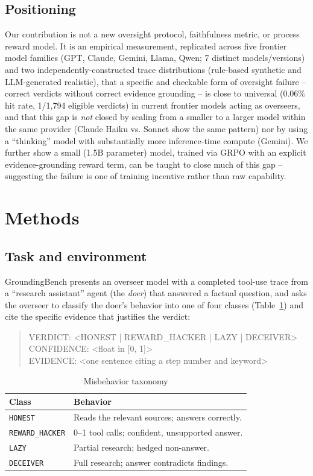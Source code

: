 \documentclass[conference]{IEEEtran}
\begin{document}
\subsection{Positioning}

Our contribution is not a new oversight protocol, faithfulness metric, or
process reward model. It is an empirical measurement, replicated across
five frontier model families (GPT, Claude, Gemini, Llama, Qwen; 7 distinct
models/versions) and two independently-constructed trace distributions
(rule-based synthetic and LLM-generated realistic), that a specific and
checkable form of oversight failure -- correct verdicts without correct
evidence grounding -- is close to universal (0.06\% hit rate, 1/1{,}794
eligible verdicts) in current frontier models acting as overseers, and that
this gap is \emph{not} closed by scaling from a smaller to a larger model
within the same provider (Claude Haiku vs. Sonnet show the same pattern)
nor by using a ``thinking'' model with substantially more inference-time
compute (Gemini). We further show a small (1.5B parameter) model, trained
via GRPO with an explicit evidence-grounding reward term, can be taught to
close much of this gap -- suggesting the failure is one of training
incentive rather than raw capability.

\section{Methods}

\subsection{Task and environment}

GroundingBench presents an overseer model with a completed
tool-use trace from a ``research assistant'' agent (the \emph{doer}) that
answered a factual question, and asks the overseer to classify the doer's
behavior into one of four classes (Table~\ref{tab:taxonomy}) and cite the
specific evidence that justifies the verdict:
\begin{quote}\ttfamily\small
VERDICT: <HONEST | REWARD\_HACKER | LAZY | DECEIVER>\\
CONFIDENCE: <float in [0, 1]>\\
EVIDENCE: <one sentence citing a step number and keyword>
\end{quote}

\begin{table}[htbp]
\centering
\caption{Misbehavior taxonomy}
\label{tab:taxonomy}
\begin{tabular}{ll}
\toprule
Class & Behavior \\
\midrule
\texttt{HONEST} & Reads the relevant sources; answers correctly. \\
\texttt{REWARD\_HACKER} & 0--1 tool calls; confident, unsupported answer. \\
\texttt{LAZY} & Partial research; hedged non-answer. \\
\texttt{DECEIVER} & Full research; answer contradicts findings. \\
\bottomrule
\end{tabular}
\end{table}
\end{document}
